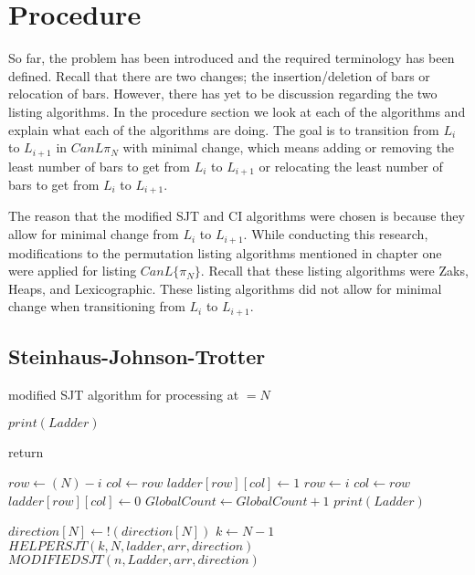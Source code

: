 \section{Procedure}

So far, the problem has been introduced and the required terminology has been defined. Recall that there are two 
changes; the insertion/deletion of bars or relocation of bars.
However, there has yet to be discussion regarding the two 
listing algorithms. In the procedure section 
we look at each of the algorithms and explain what 
each of the algorithms are doing. The goal is to transition from 
$L_{i}$ to $L_{i+1}$ in $CanL{\pi_{N}}$ with minimal change, which means adding or removing 
the least number of bars to get from $L_{i}$ to $L_{i+1}$ or relocating 
the least number of bars to get from $L_{i}$ to $L_{i+1}$.\par 

The reason that the modified SJT and CI algorithms were chosen is because they allow 
for minimal change from $L_{i}$ to $L_{i+1}$. While conducting this research, modifications 
to the permutation listing algorithms mentioned in chapter one were applied for listing $CanL\{\pi_{N}\}$. Recall that 
these listing algorithms were Zaks, Heaps, and Lexicographic. These listing algorithms 
did not allow for minimal change when transitioning from $L_{i}$ to $L_{i+1}$.
\subsection{Steinhaus-Johnson-Trotter}
\begin{algorithm}
  \caption{modified SJT algorithm for processing at $=N$}
  \begin{algorithmic}[1]


      \State $print(Ladder)$

        \State return
      \EndIf

     
        
            \State $row \gets (N) - i$
            \State $col \gets row$
            \State $ladder[row][col] \gets 1$
        \Else
            \State $row \gets i$
            \State $col \gets row$
            \State $ladder[row][col] \gets 0$
        \EndIf
        \State $GlobalCount \gets GlobalCount+1$
        \State $print(Ladder)$

      \EndFor
      \State $direction[N] \gets !(direction[N])$
      \State $k \gets N-1$
      \State $HELPERSJT(k, N, ladder, arr, direction)$
      \State $MODIFIEDSJT(n,  Ladder, arr, direction)$

    \EndFunction
  \end{algorithmic}
\end{algorithm}

